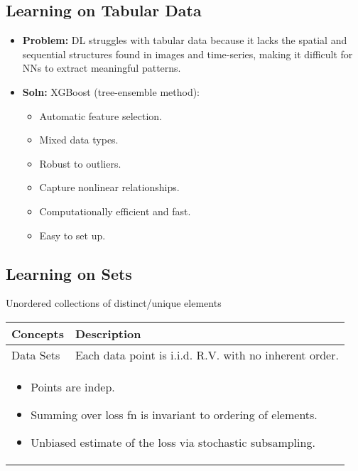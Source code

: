 \subsection{Learning on Tabular Data}
\begin{notes}
    \begin{itemize}
        \item \textbf{Problem:} DL struggles with tabular data because it lacks the spatial and sequential structures found in images and time-series, making it difficult for NNs to extract meaningful patterns. 
        \item \textbf{Soln:} XGBoost (tree-ensemble method):
        \begin{itemize}
            \item Automatic feature selection.
            \item Mixed data types.
            \item Robust to outliers.
            \item Capture nonlinear relationships.
            \item Computationally efficient and fast.
            \item Easy to set up.
        \end{itemize}
    \end{itemize}
\end{notes} 

\subsection{Learning on Sets}
\begin{summary}
    Unordered collections of distinct/unique elements 
    \begin{center}
        \begin{tabular}{ll}
            \toprule
            \textbf{Concepts} & \textbf{Description} \\
            \toprule
            Data Sets & Each data point is i.i.d. R.V. with no inherent order. \\
            \midrule
            \multicolumn{2}{p{\linewidth}}{
            \begin{itemize}
                \item Points are indep. 
                \item Summing over loss fn is invariant to ordering of elements.
                \item Unbiased estimate of the loss via stochastic subsampling.
            \end{itemize}} \\
            \bottomrule
        \end{tabular}
    \end{center}
\end{summary}